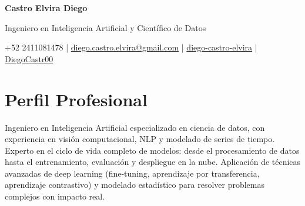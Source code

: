 \documentclass[a4paper,11pt]{article}
\newcommand{\socialicon}[1]{\raisebox{-0.05em}{\resizebox{!}{1em}{#1}}}
\newcommand{\headerfontiii}{\fontfamily{ppl}\selectfont} %
\begin{document}
\headerfontiii


\begin{center}
    {\huge\textbf{Castro Elvira Diego}}
\end{center}
\vspace{-6mm}

\begin{center}
    \small{
   Ingeniero en Inteligencia Artificial y Científico de Datos
    }
\end{center}
\vspace{-6mm}

\begin{center}
    \small{
    +52 2411081478 | \href{diego.castro.elvira@gmail.com}{diego.castro.elvira@gmail.com} | 
    \socialicon{\faLinkedin} \href{https://www.linkedin.com/in/diego-castro-elvira/}{diego-castro-elvira} | 
    \socialicon{\faGithub} \href{https://github.com/DiegoCastr00}{DiegoCastr00} 
    }
\end{center}


\vspace{-4mm}

\section{\textbf{Perfil Profesional}}
\vspace{1mm}
\footnotesize{
Ingeniero en Inteligencia Artificial especializado en ciencia de datos, con experiencia en visión computacional, NLP y modelado de series de tiempo. Experto en el ciclo de vida completo de modelos: desde el procesamiento de datos hasta el entrenamiento, evaluación y despliegue en la nube. Aplicación de técnicas avanzadas de deep learning (fine-tuning, aprendizaje por transferencia, aprendizaje contrastivo) y modelado estadístico para resolver problemas complejos con impacto real.}
\vspace{-2mm}
\end{document}
